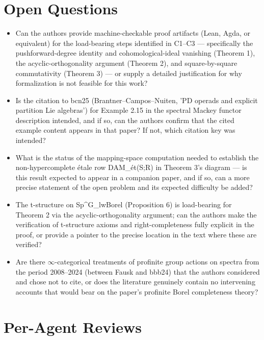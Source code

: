 \documentclass[11pt]{article}
\begin{document}
\section*{Open Questions}
\begin{itemize}[leftmargin=*]
  \item Can the authors provide machine-checkable proof artifacts (Lean, Agda, or equivalent) for the load-bearing steps identified in C1--C3 --- specifically the pushforward-degree identity and cohomological-ideal vanishing (Theorem 1), the acyclic-orthogonality argument (Theorem 2), and square-by-square commutativity (Theorem 3) --- or supply a detailed justification for why formalization is not feasible for this work?
  \item Is the citation to bcn25 (Brantner--Campos--Nuiten, 'PD operads and explicit partition Lie algebras') for Example 2.15 in the spectral Mackey functor description intended, and if so, can the authors confirm that the cited example content appears in that paper? If not, which citation key was intended?
  \item What is the status of the mapping-space computation needed to establish the non-hypercomplete étale row DAM\_ét(S;R) in Theorem 3's diagram --- is this result expected to appear in a companion paper, and if so, can a more precise statement of the open problem and its expected difficulty be added?
  \item The t-structure on Sp\^{}G\_lwBorel (Proposition 6) is load-bearing for Theorem 2 via the acyclic-orthogonality argument; can the authors make the verification of t-structure axioms and right-completeness fully explicit in the proof, or provide a pointer to the precise location in the text where these are verified?
  \item Are there \ensuremath{\infty}-categorical treatments of profinite group actions on spectra from the period 2008--2024 (between Fausk and bbb24) that the authors considered and chose not to cite, or does the literature genuinely contain no intervening accounts that would bear on the paper's profinite Borel completeness theory?
\end{itemize}

\section*{Per-Agent Reviews}
\end{document}
